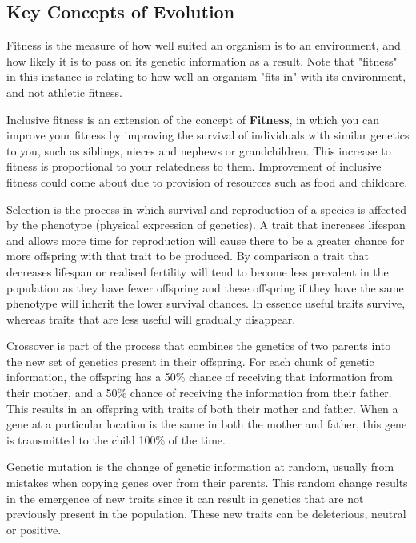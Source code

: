 \documentclass[authoryearcitations]{UoYCSproject}
\begin{document}
\subsection{Key Concepts of Evolution}
\begin{description}[style=nextline]

\item [Fitness] Fitness is the measure of how well suited an organism is to an environment, and how likely it is to pass on its genetic information as a result. Note that "fitness" in this instance is relating to how well an organism "fits in" with its environment, and not athletic fitness.

\item [Inclusive Fitness] Inclusive fitness is an extension of the concept of \textbf{Fitness}, in which you can improve your fitness by improving the survival of individuals with similar genetics to you, such as siblings, nieces and nephews or grandchildren. This increase to fitness is proportional to your relatedness to them. Improvement of inclusive fitness could come about due to provision of resources such as food and childcare.

\item[Selection] Selection is the process in which survival and reproduction of a species is affected by the phenotype (physical expression of genetics). A trait that increases lifespan and allows more time for reproduction will cause there to be a greater chance for more offspring with that trait to be produced. By comparison a trait that decreases lifespan or realised fertility will tend to become less prevalent in the population as they have fewer offspring and these offspring if they have the same phenotype will inherit the lower survival chances. In essence useful traits survive, whereas traits that are less useful will gradually disappear.

\item [Crossover] Crossover is part of the process that combines the genetics of two parents into the new set of genetics present in their offspring. For each chunk of genetic information, the offspring has a 50\% chance of receiving that information from their mother, and a 50\% chance of receiving the information from their father. This results in an offspring with traits of both their mother and father. When a gene at a particular location is the same in both the mother and father, this gene is transmitted to the child 100\% of the time. 

\item [Mutation] Genetic mutation is the change of genetic information at random, usually from mistakes when copying genes over from their parents. This random change results in the emergence of new traits since it can result in genetics that are not previously present in the population. These new traits can be deleterious, neutral or positive.


\end{description}
\end{document}
